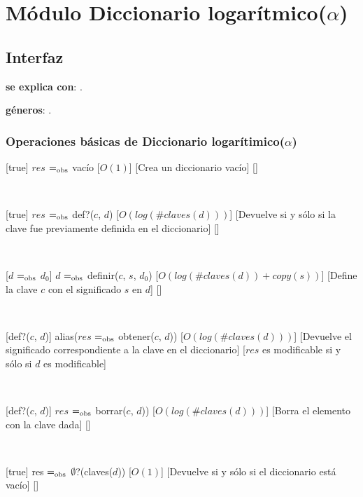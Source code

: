 \section{Módulo Diccionario logarítmico($\alpha$)}

\subsection{Interfaz}

\textbf{se explica con}: .

\textbf{géneros}: .

\subsubsection{Operaciones básicas de Diccionario logarítimico($\alpha$)}

	[true]
	{$res$ $=_{\mathrm{obs}}$ vacío}%
	[$O(1)$]
	[Crea un diccionario vacío]
	[]

	~

	[true]
	{$res$ $=_{\mathrm{obs}}$ def?($c$, $d$)}
	[$O(log(\#claves(d)))$]
	[Devuelve  si y sólo si la clave fue previamente definida en el diccionario]
	[]

	~

	[$d$ $=_{\mathrm{obs}}$ $d_0$]
	{$d$ $=_{\mathrm{obs}}$ definir($c$, $s$, $d_0$)}
	[$O(log(\#claves(d)) + copy(s))$]
	[Define la clave $c$ con el significado $s$ en $d$]
	[]

	~

	[def?($c$, $d$)]
	{alias($res$ $=_{\mathrm{obs}}$ obtener($c$, $d$))}
	[$O(log(\#claves(d)))$]
	[Devuelve el significado correspondiente a la clave en el diccionario]
	[$res$ es modificable si y sólo si $d$ es modificable]

	~

	[def?($c$, $d$)]
	{$res$ $=_{\mathrm{obs}}$ borrar($c$, $d$))}
	[$O(log(\#claves(d)))$]
	[Borra el elemento con la clave dada]
	[]

	~

	[true]
	{res $=_{\mathrm{obs}}$ $\emptyset$?(claves($d$))}
	[$O(1)$]
	[Devuelve  si y sólo si el diccionario está vacío]
	[]

